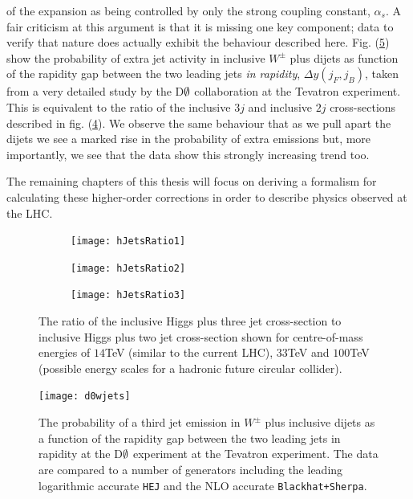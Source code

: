 		of the expansion as being controlled by only the strong coupling constant, $\alpha_s$.  A fair criticism at this argument is that
		it is missing one key component; data to verify that nature does actually exhibit the behaviour described here.  Fig.
		(\ref{fig:d0wjets}) show the probability of extra jet activity in inclusive $W^\pm$ plus dijets as function of the rapidity gap
		between the two leading jets \emph{in rapidity}, $\Delta y(j_F, j_B)$, taken from a very detailed study by the D$\emptyset$
		collaboration \cite{Abazov:2013gpa} at the Tevatron experiment.  This is equivalent to the ratio of the inclusive $3j$ and
		inclusive $2j$ cross-sections described in fig. (\ref{fig:higgsratios}).  We observe the same behaviour that as we pull apart
		the dijets we see a marked rise in the probability of extra emissions but, more importantly, we see that the data show this
		strongly increasing trend too.

		The remaining chapters of this thesis will focus on deriving a formalism for calculating these higher-order corrections in order
		to describe physics observed at the LHC.

		\begin{figure}[tpb]
			\centering
			\hspace{-0.8cm}
			\begin{subfigure}[b]{0.7\textwidth}
				\texttt{[image: hJetsRatio1]}
				\caption{}
				\label{fig:hJetsRatio1}
			\end{subfigure}
			\begin{subfigure}[b]{0.48\textwidth}
				\texttt{[image: hJetsRatio2]}
				\caption{}
				\label{fig:hJetsRatio2}
			\end{subfigure}
			\begin{subfigure}[b]{0.48\textwidth}
				\texttt{[image: hJetsRatio3]}
				\caption{}
				\label{fig:hJetsRatio3}
			\end{subfigure}

			\caption{The ratio of the inclusive Higgs plus three jet cross-section to inclusive Higgs plus two jet cross-section
			         shown for centre-of-mass energies of $14$TeV (similar to the current LHC), $33$TeV and $100$TeV (possible
			         energy scales for a hadronic future circular collider).}

			\label{fig:higgsratios}
		\end{figure}

		\begin{figure}[hbtp]
			\centering
			\texttt{[image: d0wjets]}
			\caption{The probability of a third jet emission in $W^\pm$ plus inclusive dijets as a function of the rapidity gap
			         between the two leading jets in rapidity at the D$\emptyset$ experiment at the Tevatron experiment.
			         The data are compared to a number of generators including the leading logarithmic accurate \texttt{HEJ}
			         and the NLO accurate \texttt{Blackhat+Sherpa}.}
			\label{fig:d0wjets}
  		\end{figure}

